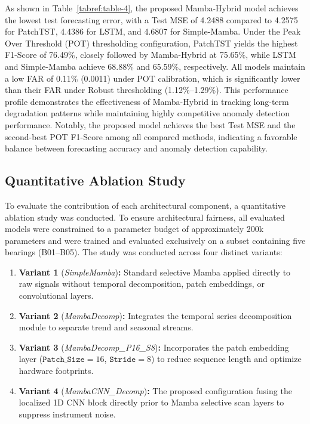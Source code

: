 \documentclass[cmes,article,submit,moreauthors,pdftex]{Definitions/tsp}
\begin{document}
As shown in Table~\ref{tabref:table-4}, the proposed Mamba-Hybrid model achieves the lowest test forecasting error, with a Test MSE of 4.2488 compared to 4.2575 for PatchTST, 4.4386 for LSTM, and 4.6807 for Simple-Mamba. Under the Peak Over Threshold (POT) thresholding configuration, PatchTST yields the highest F1-Score of 76.49\%, closely followed by Mamba-Hybrid at 75.65\%, while LSTM and Simple-Mamba achieve 68.88\% and 65.59\%, respectively. All models maintain a low FAR of 0.11\% (0.0011) under POT calibration, which is significantly lower than their FAR under Robust thresholding (1.12\%--1.29\%). This performance profile demonstrates the effectiveness of Mamba-Hybrid in tracking long-term degradation patterns while maintaining highly competitive anomaly detection performance. Notably, the proposed model achieves the best Test MSE and the second-best POT F1-Score among all compared methods, indicating a favorable balance between forecasting accuracy and anomaly detection capability.

\subsection{Quantitative Ablation Study} \label{sect:s5dot3}
To evaluate the contribution of each architectural component, a quantitative ablation study was conducted. To ensure architectural fairness, all evaluated models were constrained to a parameter budget of approximately 200k parameters and were trained and evaluated exclusively on a subset containing five bearings (B01--B05). The study was conducted across four distinct variants:
\begin{enumerate}
\item \textbf{Variant 1} (\textit{SimpleMamba})\textbf{:} Standard selective Mamba applied directly to raw signals without temporal decomposition, patch embeddings, or convolutional layers.
\item \textbf{Variant 2} (\textit{MambaDecomp})\textbf{:} Integrates the temporal series decomposition module to separate trend and seasonal streams.
\item \textbf{Variant 3} (\textit{MambaDecomp\_P16\_S8})\textbf{:} Incorporates the patch embedding layer ($\texttt{Patch\_Size} = 16$, $\texttt{Stride} = 8$) to reduce sequence length and optimize hardware footprints.
\item \textbf{Variant 4} (\textit{MambaCNN\_Decomp})\textbf{:} The proposed configuration fusing the localized 1D CNN block directly prior to Mamba selective scan layers to suppress instrument noise.
\end{enumerate}
\end{document}
